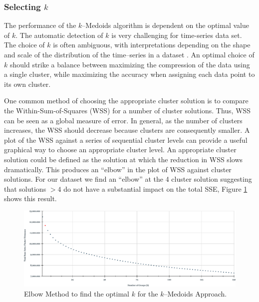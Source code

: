 
\subsubsection{Selecting $k$}
\label{Sec:Selectk}


The performance of the $k$--Medoids algorithm is dependent on the optimal value of $k$. The automatic detection of $k$ is very challenging for time-series data set. The choice of $k$ is often ambiguous, with interpretations depending on the shape and scale of the distribution of the time--series in a dataset \cite{Liao2005}. An optimal choice of $k$ should strike a balance between maximizing the compression of the data using a single cluster, while maximizing the accuracy when assigning each data point to its own cluster. 

One common method of choosing the appropriate cluster solution is to compare the Within-Sum-of-Squares (WSS) for a number of cluster solutions. Thus, WSS can be seen as a global measure of error. In general, as the number of clusters increases, the WSS should decrease because clusters are consequently smaller. A plot of the WSS against a series of sequential cluster levels can provide a useful graphical way to choose an appropriate cluster level. An appropriate cluster solution could be defined as the solution at which the reduction in WSS slows dramatically. This produces an ``elbow'' in the plot of WSS against cluster solutions. For our dataset we find an ``elbow'' at the 4 cluster solution suggesting that solutions $> 4$ do not have a substantial impact on the total SSE, Figure \ref{Fig:SSE-kMedoids} shows this result.

\begin{figure}[h]
	\centering
	\includegraphics[scale=0.5]{../Figures/Elbow-Kmedoids}
	\caption{Elbow Method to find the optimal $k$ for the $k$--Medoids Approach.}
	\label{Fig:SSE-kMedoids}
\end{figure}

